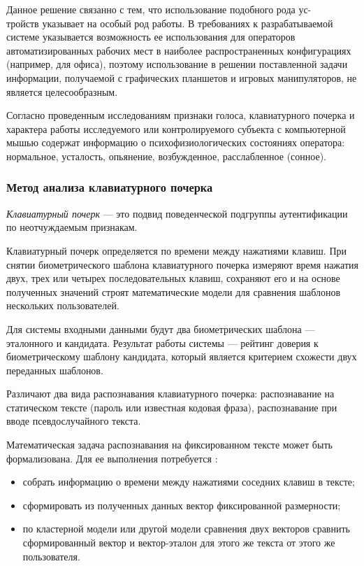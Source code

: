 Данное решение связанно с тем, что использование подобного рода ус-\\тройств указывает на особый род работы. В требованиях к разрабатываемой системе указывается возможность ее использования для операторов автоматизированных рабочих мест в наиболее распространенных  конфигурациях (например, для офиса), поэтому использование в решении поставленной задачи информации, получаемой с графических планшетов и игровых манипуляторов, не является целесообразным.

Согласно проведенным исследованиям \cite{recognitionOfPsycho} признаки голоса, клавиатурного почерка и характера работы исследуемого или контролируемого субъекта с компьютерной мышью содержат информацию о психофизиологических состояниях оператора: нормальное, усталость, опьянение, возбужденное, расслабленное (сонное).

\subsubsection{Метод анализа клавиатурного почерка}
\textit{Клавиатурный почерк} --- это подвид поведенческой подгруппы аутентификации по неотчуждаемым признакам. \cite{keystroke}

Клавиатурный почерк определяется по времени между нажатиями клавиш. При снятии биометрического шаблона клавиатурного почерка измеряют время нажатия двух, трех или четырех последовательных клавиш, сохраняют его и на основе полученных значений строят математические модели для сравнения шаблонов нескольких пользователей. \cite{intrusionDetection}

 Для системы входными данными будут два биометрических шаблона --- эталонного и кандидата. Результат работы системы --- рейтинг доверия к биометрическому шаблону кандидата, который является критерием схожести двух переданных шаблонов.

Различают два вида распознавания клавиатурного почерка: распознавание на статическом тексте (пароль или известная кодовая фраза), распознавание при вводе псевдослучайного текста. \cite{keystroke}

Математическая задача распознавания на фиксированном тексте может быть формализована. Для ее выполнения потребуется \cite{keystroke}:
\begin{itemize}
\item собрать информацию о времени между нажатиями соседних клавиш в тексте;
\item сформировать из полученных данных вектор фиксированной размерности;
\item по кластерной модели или другой модели сравнения двух векторов сравнить сформированный вектор и вектор-эталон для этого же текста от этого же пользователя.
\end{itemize}

